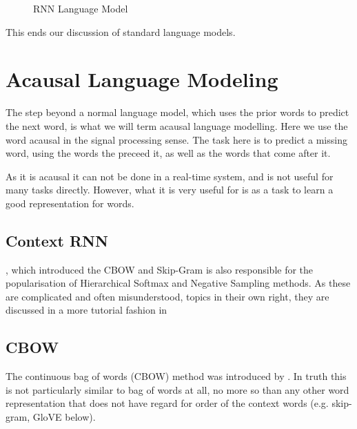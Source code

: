 \documentclass[parskip]{komatufte}
\begin{document}
\begin{figure}
	\centering
	 
	\caption{\label{fig:neural-language-model} RNN Language Model}
\end{figure}

This ends our discussion of standard language models.


\section{Acausal Language Modeling}
The step beyond a normal language model,
which uses the prior words to predict the next word,
is what we will term acausal language modelling.
Here we use the word acausal in the signal processing sense.
The task here is to predict a missing word, using the words the preceed it, as well as the words that come after it.

As it is acausal it can not be done in a real-time system, and is not useful for many tasks directly.
However, what it is very useful for is as a task to learn a good representation for words.


\subsection{Context RNN}





, which introduced the CBOW and Skip-Gram is also responsible for the popularisation of Hierarchical Softmax and Negative Sampling methods.
As these are complicated and often misunderstood, topics in their own right, they are discussed in a more tutorial fashion in \Cref{} 

\subsection{CBOW}
The continuous bag of words (CBOW) method was introduced by .
In truth this is not particularly similar to bag of words at all, no more so than any other word representation that does not have regard for order of the context words (e.g. skip-gram, GloVE below).
\end{document}
